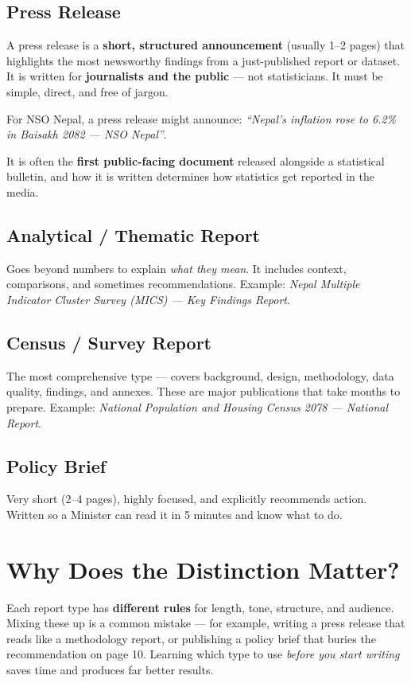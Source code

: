 \documentclass[11pt,a4paper,oneside]{book}
\begin{document}
\subsection*{Press Release}
A press release is a \textbf{short, structured announcement} (usually 1--2 pages) that highlights the most newsworthy findings from a just-published report or dataset. It is written for \textbf{journalists and the public} --- not statisticians. It must be simple, direct, and free of jargon.

For NSO Nepal, a press release might announce: \emph{``Nepal's inflation rose to 6.2\% in Baisakh 2082 --- NSO Nepal''}.

It is often the \textbf{first public-facing document} released alongside a statistical bulletin, and how it is written determines how statistics get reported in the media.

\subsection*{Analytical / Thematic Report}
Goes beyond numbers to explain \emph{what they mean}. It includes context, comparisons, and sometimes recommendations. Example: \emph{Nepal Multiple Indicator Cluster Survey (MICS) --- Key Findings Report}.

\subsection*{Census / Survey Report}
The most comprehensive type --- covers background, design, methodology, data quality, findings, and annexes. These are major publications that take months to prepare. Example: \emph{National Population and Housing Census 2078 --- National Report}.

\subsection*{Policy Brief}
Very short (2--4 pages), highly focused, and explicitly recommends action. Written so a Minister can read it in 5 minutes and know what to do.

\section{Why Does the Distinction Matter?}

Each report type has \textbf{different rules} for length, tone, structure, and audience. Mixing these up is a common mistake --- for example, writing a press release that reads like a methodology report, or publishing a policy brief that buries the recommendation on page 10. Learning which type to use \emph{before you start writing} saves time and produces far better results.
\end{document}
